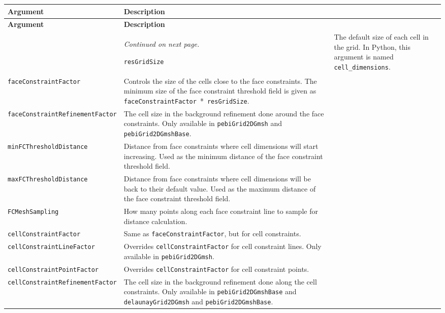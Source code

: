 \begin{tabularx}{\textwidth}{l X}
    \caption{Arguments controlling background grid refinement in \texttt{gmsh4mrst}.}
    \label{tab:grid-arguments} \\
    \toprule \textbf{Argument} & \textbf{Description} \\\midrule \endfirsthead
    \textbf{Argument} & \textbf{Description} \\\midrule \endhead
    \bottomrule & \textit{Continued on next page.} \endfoot
    \bottomrule \endlastfoot
    
    \texttt{resGridSize} & The default size of each cell in the grid. In Python, this argument is named \texttt{cell\_dimensions}. \\
    \texttt{faceConstraintFactor} & Controls the size of the cells close to the face constraints. The minimum size of the face constraint threshold field is given as \texttt{faceConstraintFactor}~*~\texttt{resGridSize}. \\
    \texttt{faceConstraintRefinementFactor} & The cell size in the background refinement done around the face constraints. Only available in \texttt{pebiGrid2DGmsh} and \texttt{pebiGrid2DGmshBase}. \\
    \texttt{minFCThresholdDistance} & Distance from face constraints where cell dimensions will start increasing. Used as the minimum distance of the face constraint threshold field. \\
    \texttt{maxFCThresholdDistance} & Distance from face constraints where cell dimensions will be back to their default value. Used as the maximum distance of the face constraint threshold field. \\
    \texttt{FCMeshSampling} & How many points along each face constraint line to sample for distance calculation. \\
    \texttt{cellConstraintFactor} & Same as \texttt{faceConstraintFactor}, but for cell constraints. \\
    \texttt{cellConstraintLineFactor} & Overrides \texttt{cellConstraintFactor} for cell constraint lines. Only available in \texttt{pebiGrid2DGmsh}. \\
    \texttt{cellConstraintPointFactor} & Overrides \texttt{cellConstraintFactor} for cell constraint points. \\
    \texttt{cellConstraintRefinementFactor} & The cell size in the background refinement done along the cell constraints. Only available in \texttt{pebiGrid2DGmshBase} and \texttt{delaunayGrid2DGmsh} and \texttt{pebiGrid2DGmshBase}. \\

\end{tabularx}
